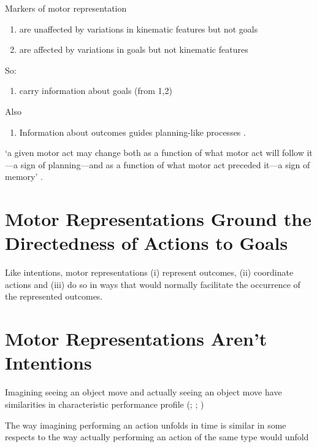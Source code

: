 \documentclass[12pt]{extarticle}
\begin{document}
\begin{multicols*}{3}
Markers of motor representation 
\begin{enumerate}
\item are unaffected by variations in kinematic features but not goals 
  \citep[e.g.][]{cattaneo:2010_state-dependent,umilta:2008pliers,cattaneo:2009_representation,rochat:2010_responses}
\item are affected by variations in goals but not kinematic features
  \citep[e.g.][]{Fogassi:2005nf,bonini:2010_ventral,cattaneo:2007_impairment,Umilta:2001zr,villiger:2010_activity,koch:2010_resonance}
\end{enumerate}
So:
\begin{enumerate}[resume]
\item carry information about goals (from 1,2)
\end{enumerate}
Also
\begin{enumerate}[resume]
\item Information about outcomes guides planning-like processes
  \citep[consider][]{grafton:2007_evidence,jeannerod:1988_neural,wolpert:1995internal, miall:1996_forward,arbib:1985_coordinated,mason:2001_hand,santello:2002_patterns}.
\end{enumerate}
 
‘a given motor act may change both as a function of what motor act will follow it—a sign of
planning—and as a function of what motor act preceded it—a sign
of memory’ \citep[p.~294]{cohen:2004_wherea}.
 
 
 
\section{Motor Representations Ground the Directedness of Actions to Goals}

Like intentions, motor representations (i) represent outcomes, (ii) coordinate actions and (iii) do so in ways that would normally facilitate the occurrence of the represented outcomes.

\section{Motor Representations Aren’t Intentions}

Imagining seeing an object move and actually seeing an object move have similarities in
characteristic performance profile
(\citealp{kosslyn:1978_measuring}; \citealp[p.\ 99ff]{kosslyn:1994_image}; \citealp{kosslyn:1978_visual})

The way imagining performing an action unfolds in time is
similar in some respects to the way actually performing an action of the same type would unfold
\citep{decety:1989_timing, decety:1996_imagined, Jeannerod:1994oz, parsons:1994_temporal,
frak:2001_orientation}


\end{multicols*}
\end{document}
